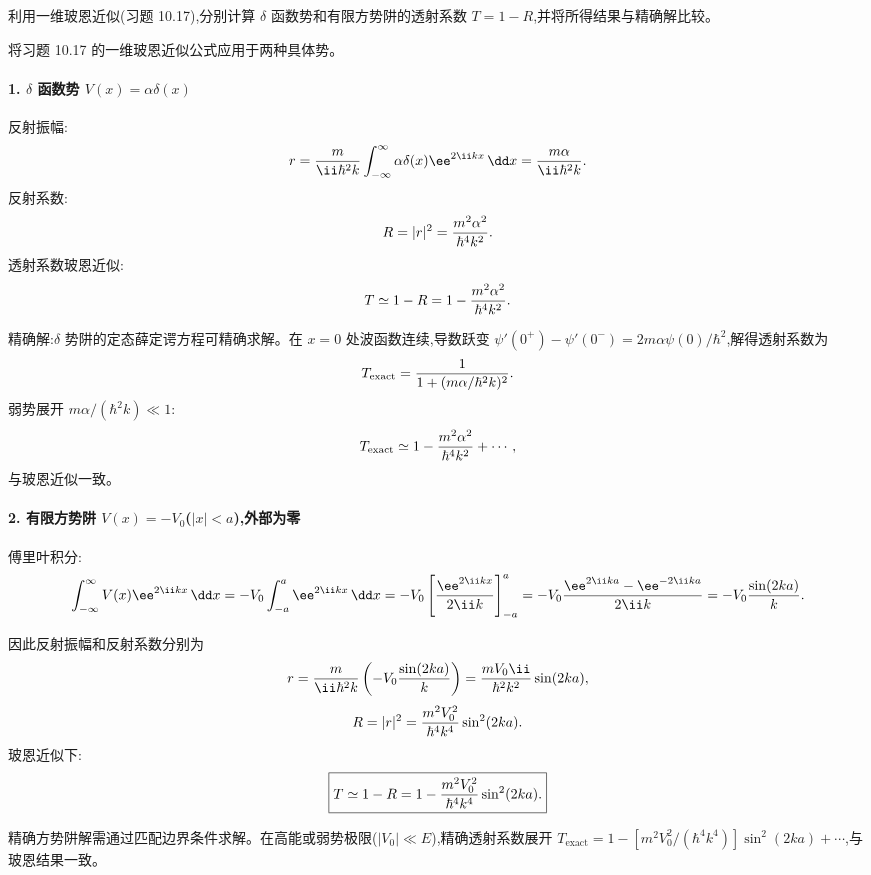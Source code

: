 \begin{question}
利用一维玻恩近似(习题 10.17),分别计算 $\delta$ 函数势和有限方势阱的透射系数 $T=1-R$,并将所得结果与精确解比较。
\begin{solution}
将习题 10.17 的一维玻恩近似公式应用于两种具体势。

\paragraph{1. $\delta$ 函数势 $V(x)=\alpha\delta(x)$}

反射振幅:
\[
r={m\over\ii\hbar^2k}\int_{-\infty}^{\infty}\alpha\delta(x)\ee^{2\ii kx}\,\dd x
={m\alpha\over\ii\hbar^2k}.
\]
反射系数:
\[
R=|r|^2={m^2\alpha^2\over\hbar^4k^2}.
\]
透射系数玻恩近似:
\[
T\simeq1-R=1-{m^2\alpha^2\over\hbar^4k^2}.
\]

精确解:$\delta$ 势阱的定态薛定谔方程可精确求解。在 $x=0$ 处波函数连续,导数跃变 $\psi'(0^+)-\psi'(0^-)=2m\alpha\psi(0)/\hbar^2$,解得透射系数为
\[
T_{\text{exact}}={1\over1+(m\alpha/\hbar^2k)^2}.
\]
弱势展开 $m\alpha/(\hbar^2k)\ll1$:
\[
T_{\text{exact}}\simeq 1-{m^2\alpha^2\over\hbar^4k^2}+\cdots,
\]
与玻恩近似一致。

\paragraph{2. 有限方势阱 $V(x)=-V_0$($|x|<a$),外部为零}

傅里叶积分:
\[
\int_{-\infty}^{\infty}V(x)\ee^{2\ii kx}\,\dd x
=-V_0\int_{-a}^{a}\ee^{2\ii kx}\,\dd x
=-V_0\left[{\ee^{2\ii kx}\over2\ii k}\right]_{-a}^{a}
=-V_0{\ee^{2\ii ka}-\ee^{-2\ii ka}\over2\ii k}
=-V_0{\sin(2ka)\over k}.
\]

因此反射振幅和反射系数分别为
\[
r={m\over\ii\hbar^2k}\left(-V_0{\sin(2ka)\over k}\right)
={m V_0\ii\over\hbar^2k^2}\sin(2ka),
\]
\[
R=|r|^2={m^2 V_0^2\over\hbar^4k^4}\sin^2(2ka).
\]
玻恩近似下:
\[
\boxed{T\simeq1-R=1-{m^2 V_0^2\over\hbar^4k^4}\sin^2(2ka).}
\]

精确方势阱解需通过匹配边界条件求解。在高能或弱势极限($|V_0|\ll E$),精确透射系数展开 $T_{\text{exact}}=1-[m^2V_0^2/(\hbar^4k^4)]\sin^2(2ka)+\cdots$,与玻恩结果一致。
\end{solution}
\end{question}

